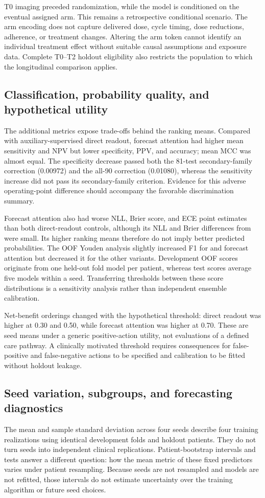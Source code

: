 T0 imaging preceded randomization, while the model is conditioned on the eventual assigned arm. This remains a retrospective conditional scenario. The arm encoding does not capture delivered dose, cycle timing, dose reductions, adherence, or treatment changes. Altering the arm token cannot identify an individual treatment effect without suitable causal assumptions and exposure data. Complete T0--T2 holdout eligibility also restricts the population to which the longitudinal comparison applies.

\subsection{Classification, probability quality, and hypothetical utility}
The additional metrics expose trade-offs behind the ranking means. Compared with auxiliary-supervised direct readout, forecast attention had higher mean sensitivity and NPV but lower specificity, PPV, and accuracy; mean MCC was almost equal. The specificity decrease passed both the 81-test secondary-family correction (0.00972) and the all-90 correction (0.01080), whereas the sensitivity increase did not pass its secondary-family criterion. Evidence for this adverse operating-point difference should accompany the favorable discrimination summary.

Forecast attention also had worse NLL, Brier score, and ECE point estimates than both direct-readout controls, although its NLL and Brier differences from \nojepa{} were small. Its higher ranking means therefore do not imply better predicted probabilities. The OOF Youden analysis slightly increased F1 for \nojepa{} and forecast attention but decreased it for the other variants. Development OOF scores originate from one held-out fold model per patient, whereas test scores average five models within a seed. Transferring thresholds between these score distributions is a sensitivity analysis rather than independent ensemble calibration.

Net-benefit orderings changed with the hypothetical threshold: direct readout was higher at 0.30 and 0.50, while forecast attention was higher at 0.70. These are seed means under a generic positive-action utility, not evaluations of a defined care pathway. A clinically motivated threshold requires consequences for false-positive and false-negative actions to be specified and calibration to be fitted without holdout leakage.

\subsection{Seed variation, subgroups, and forecasting diagnostics}
The mean and sample standard deviation across four seeds describe four training realizations using identical development folds and holdout patients. They do not turn seeds into independent clinical replications. Patient-bootstrap intervals and tests answer a different question: how the mean metric of these fixed predictors varies under patient resampling. Because seeds are not resampled and models are not refitted, those intervals do not estimate uncertainty over the training algorithm or future seed choices.

